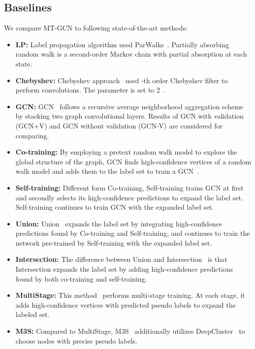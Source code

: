 \documentclass{article}
\begin{document}
\subsection{Baselines}
We compare MT-GCN to following state-of-the-art methods:
\begin{itemize}
  \item {\bf LP:} Label propagation algorithm used ParWalks~\cite{wu2012learning}. Partially absorbing random walk is a second-order Markov chain with partial absorption at each state.
  \item{\bf Chebyshev:} Chebyshev approach~\cite{defferrard2016convolutional} used -th order Chebyshev filter to perform convolutions. The parameter  is set to 2~\cite{kipf2016semi}.
  \item {\bf GCN:} GCN~\cite{kipf2016semi} follows a recursive average neighborhood aggregation scheme by stacking two graph convolutional layers. Results of GCN with validation (GCN+V) and GCN without validation (GCN-V) are considered for comparing.
  \item {\bf Co-training:} By employing a pretext random walk model to explore the global structure of the graph, GCN finds high-confidence vertices of a random walk model and adds them to the label set to train a GCN~\cite{li2018deeper}.
  \item {\bf Self-training:} Different form Co-training, Self-training trains GCN at first and secondly selects its high-confidence predictions to expand the label set. Self-training continues to train GCN with the expanded label set.
  \item {\bf Union:} Union~\cite{li2018deeper} expands the label set by integrating high-confidence predictions found by Co-training and Self-training, and continues to train the network pre-trained by Self-training with the expanded label set.
  \item {\bf Intersection:} The difference between Union and Intersection~\cite{li2018deeper} is that Intersection expands the label set by adding high-confidence predictions found by both co-training and self-training.
  \item {\bf MultiStage:} This method~\cite{sun2019multi} performs multi-stage training. At each stage, it adds high-confidence vertices with predicted pseudo labels to expand the labeled set.
  \item {\bf M3S:} Compared to MultiStage, M3S~\cite{sun2019multi} additionally utilizes DeepCluster~\cite{caron2018deep} to choose nodes with precise pseudo labels.
\end{itemize}
\end{document}
